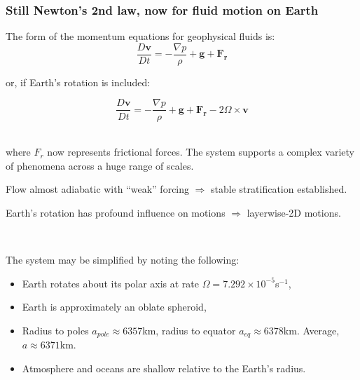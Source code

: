 \documentclass[xcolor=dvipsnames]{beamer} %
\newcommand{\BSS}{ \begin{scriptsize}}
\newcommand{\ESS}{ \end{scriptsize}}
\newcommand{\lagd}[2]{\frac{D #1}{D #2}}
\begin{document}
\begin{frame}  
\frametitle{Still Newton's 2nd law, now for fluid motion on Earth}
\BSS
The form of the momentum equations for geophysical fluids is:
\begin{equation}
	\lagd{\mathbf{v}}{t} =-\frac {\nabla p}{\rho}+\mathbf{g}+\mathbf{F_r}
\end{equation}

or, if Earth's rotation is included:

\begin{equation}
	\lagd{\mathbf{v}}{t} =-\frac {\nabla p}{\rho}+\mathbf{g}+\mathbf{F_r} - 2 \Omega \times \mathbf{v}
\end{equation}
~

where $F_r$ now represents frictional forces. The system supports a complex variety of phenomena across a huge range of scales.

Flow almost adiabatic with ``weak'' forcing $\Rightarrow$ stable
stratification established.

Earth's rotation has profound influence on motions $\Rightarrow$
layerwise-2D motions.

~

The system may be simplified by noting the following:

\begin{itemize}
\item
Earth rotates about its polar axis at rate $\Omega=7.292 \times 10^{-5}$s$^{-1}$,

\item
Earth is approximately an oblate spheroid,

\item 
Radius to poles $a_{pole}\approx 6357$km, radius to equator $a_{eq}\approx
6378$km. Average, $a\approx 6371$km.

\item
Atmosphere and oceans are shallow relative to the Earth's radius.
\end{itemize}
\ESS

\end{frame}
\end{document}
